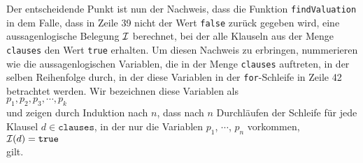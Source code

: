 Der entscheidende Punkt ist nun der Nachweis, dass die Funktion \texttt{findValuation} in dem Falle,
dass in Zeile 39 nicht der Wert \texttt{false} zur\"{u}ck gegeben wird, eine aussagenlogische Belegung $\mathcal{I}$ berechnet, bei der
alle Klauseln aus der Menge \texttt{clauses} den Wert \texttt{true} erhalten.  Um diesen Nachweis zu
erbringen, nummerieren wie die aussagenlogischen Variablen, die in der Menge \texttt{clauses}
auftreten, in der selben Reihenfolge durch, in der diese Variablen in der \texttt{for}-Schleife in Zeile
42 betrachtet werden.  Wir bezeichnen diese Variablen als
\\[0.2cm]
\hspace*{1.3cm}
 $p_1, p_2, p_3, \cdots, p_k$
\\[0.2cm]
und zeigen durch Induktion nach $n$, dass nach $n$ Durchl\"{a}ufen der Schleife f\"{u}r jede Klausel $d \in \mathtt{clauses}$, in der nur
die Variablen $p_1$, $\cdots$, $p_n$ vorkommen, 
\\[0.2cm]
\hspace*{1.3cm}
$\mathcal{I}(d) = \mathtt{true}$
\\[0.2cm]
gilt.
